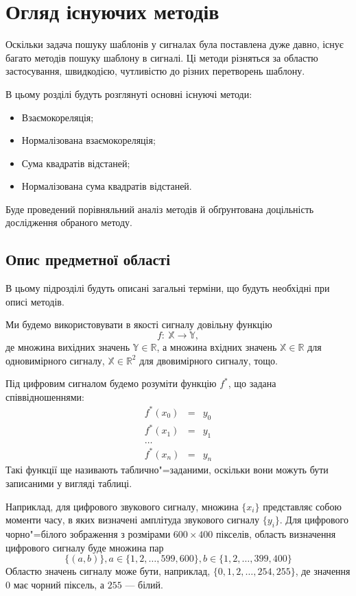 \chapter{Огляд існуючих методів}

Оскільки задача пошуку шаблонів у сигналах була поставлена дуже давно, існує багато методів пошуку шаблону в сигналі.
Ці методи різняться за областю застосування, швидкодією, чутливістю до різних перетворень шаблону.

В цьому розділі будуть розглянуті основні існуючі методи:
\begin{itemize}
    \item Взаємокореляція;
    \item Нормалізована взаємокореляція;
    \item Сума квадратів відстаней;
    \item Нормалізована сума квадратів відстаней.
\end{itemize}

Буде проведений порівняльний аналіз методів й обґрунтована доцільність дослідження обраного методу.

\section{Опис предметної області}
    В цьому підрозділі будуть описані загальні терміни, що будуть необхідні при описі методів.

    Ми будемо використовувати в якості сигналу довільну функцію
    \[f:\:\mathbb{X} \rightarrow \mathbb{Y},\] де множина вихідних значень $\mathbb{Y} \in \mathbb{R}$, а множина
    вхідних значень $\mathbb{X} \in \mathbb{R}$ для одновимірного сигналу, $\mathbb{X} \in \mathbb{R}^2$ для
    двовимірного сигналу, тощо.

    Під цифровим сигналом будемо розуміти функцію $f^*$, що задана співвідношеннями:
    \begin{eqnarray*}
        f^*(x_0) &=& y_0\\
        f^*(x_1) &=& y_1\\
        \dots\\
        f^*(x_n) &=& y_n
    \end{eqnarray*}
    Такі функції ще називають таблично"=заданими, оскільки вони можуть бути записаними у вигляді таблиці.

    Наприклад, для цифрового звукового сигналу, множина $\{x_i\}$ представляє собою моменти часу, в яких визначені
    амплітуда звукового сигналу $\{y_i\}$.
    Для цифрового чорно"=білого зображення з розмірами $600 \times 400$ пікселів, область визначення цифрового сигналу
    буде множина пар
    \[\{ (a, b) \}, a \in \{1,2,\dots,599,600\}, b \in \{1,2,\dots,399,400\}\]
    Областю значень сигналу може бути, наприклад, $\{0,1,2,\dots,254,255\}$, де значення $0$ має чорний піксель, а
    $255$ --- білий.

